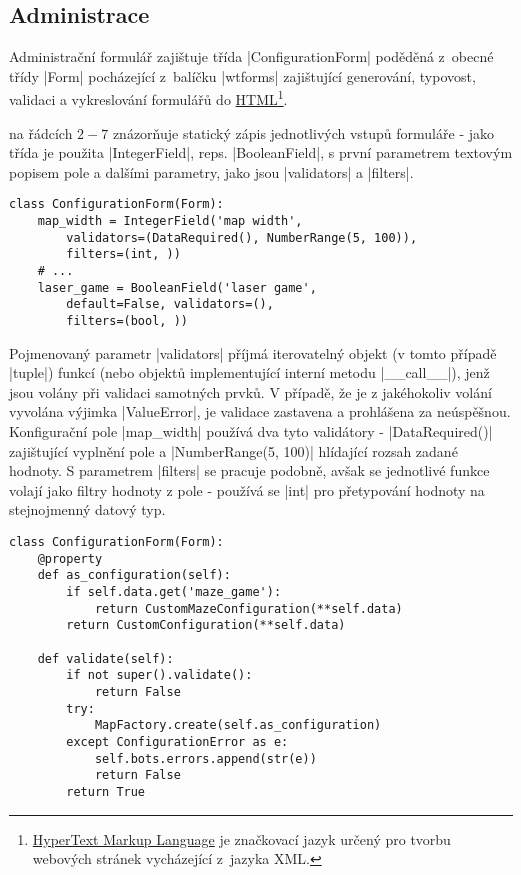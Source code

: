 \subsection{Administrace}
\label{subsec:administration}

Administrační formulář zajištuje třída \ic|ConfigurationForm| poděděná z~obecné třídy \ic|Form| pocházející z~balíčku \ic|wtforms| zajištující generování, typovost, validaci a vykreslování formulářů do \href{https://cs.wikipedia.org/wiki/HyperText_Markup_Language}{HTML}\footnote{\href{https://cs.wikipedia.org/wiki/HyperText_Markup_Language}{HyperText Markup Language} je značkovací jazyk určený pro tvorbu webových stránek vycházející z~jazyka XML.}.

 na řádcích $2-7$ znázorňuje statický zápis jednotlivých vstupů formuláře - jako třída je použita \ic|IntegerField|, reps. \ic|BooleanField|, s první parametrem textovým popisem pole a dalšími parametry, jako jsou \ic|validators| a \ic|filters|.

\begin{lstlisting}[caption={Ukázka deklarace polí konfiguračního formuláře},label={lst:conf-form-fields}]
class ConfigurationForm(Form):
    map_width = IntegerField('map width',
        validators=(DataRequired(), NumberRange(5, 100)),
        filters=(int, ))
    # ...
    laser_game = BooleanField('laser game',
        default=False, validators=(),
        filters=(bool, ))
\end{lstlisting}

Pojmenovaný parametr \ic|validators| příjmá iterovatelný objekt (v tomto případě \ic|tuple|) funkcí (nebo objektů implementující interní metodu \ic|__call__|), jenž jsou volány při validaci samotných prvků. V případě, že je z jakéhokoliv volání vyvolána výjimka \ic|ValueError|, je validace zastavena a prohlášena za neúspěšnou. Konfigurační pole \ic|map_width| používá dva tyto validátory - \ic|DataRequired()| zajištující vyplnění pole a \ic|NumberRange(5, 100)| hlídající rozsah zadané hodnoty. S parametrem \ic|filters| se pracuje podobně, avšak se jednotlivé funkce volají jako filtry hodnoty z pole - používá se \ic|int| pro přetypování hodnoty na stejnojmenný datový typ.

\begin{lstlisting}[caption={Implementace vlastních metod v $ConfigurationForm$},label={lst:conf-form-methods}]
class ConfigurationForm(Form):
    @property
    def as_configuration(self):
        if self.data.get('maze_game'):
            return CustomMazeConfiguration(**self.data)
        return CustomConfiguration(**self.data)

    def validate(self):
        if not super().validate():
            return False
        try:
            MapFactory.create(self.as_configuration)
        except ConfigurationError as e:
            self.bots.errors.append(str(e))
            return False
        return True
\end{lstlisting}
